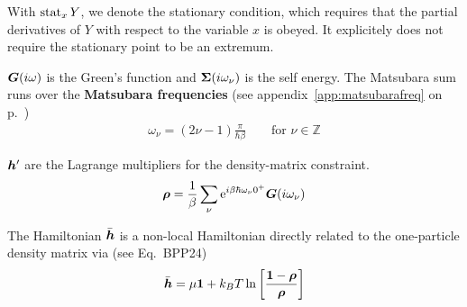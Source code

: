 \documentclass[11pt,a4paper]{report}
\begin{document}
With $\operatorname*{stat}_x Y$, we denote the stationary condition, which requires
that the partial derivatives of $Y$ with respect to the variable $x$ is
obeyed. It explicitely does not require the stationary point to be an
extremum.

$\bm{G}(i\omega)$ is the Green's function and
$\bm{\Sigma}(i\omega_\nu)$ is the self energy.  The Matsubara sum
runs over the \textbf{Matsubara frequencies} (see appendix~\ref{app:matsubarafreq} on
p.~\pageref{app:matsubarafreq})
\begin{eqnarray}
\omega_\nu=(2\nu-1)\frac{\pi}{\hbar\beta}
\qquad\text{for $\nu\in\mathbb{Z}$}
\end{eqnarray}

$\bm{h}'$ are the
Lagrange multipliers for the density-matrix constraint.
\begin{eqnarray}
\bm{\rho}=\frac{1}{\beta}
\sum_\nu\mathrm{e}^{i\beta\hbar\omega_\nu0^+}\bm{G}(i\omega_\nu)
\label{eq:rhoofg}
\end{eqnarray}

The Hamiltonian $\bar{\bm{h}}$ is a non-local Hamiltonian directly
related to the one-particle density matrix via (see Eq.~BPP24)
\begin{eqnarray}
\bar{\bm{h}}=\mu\bm{1}+k_BT\ln
\left[\frac{\bm{1}-\bm{\rho}}{\bm{\rho}}\right]
\label{eq:defhbar}
\end{eqnarray}
\end{document}
